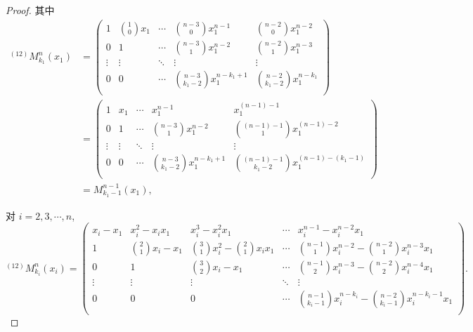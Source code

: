 \documentclass[color=black,device=normal,lang=cn,mode=geye]{elegantnote}
\begin{document}
\begin{landscape}
\begin{proof}
    其中
    \begin{align*}
        ^{(12)}M_{k_1}^n(x_1) & =\begin{pmatrix}
        1 & \binom{1}{0}x_1 & \cdots & \binom{n-3}{0}x_1^{n-1} & \binom{n-2}{0}x_1^{n-2} \\[10pt]
        0 & 1 & \cdots & \binom{n-3}{1}x_1^{n-2} & \binom{n-2}{1}x_1^{n-3} \\
        \vdots & \vdots & \ddots& \vdots  & \vdots \\[4pt]
        0 & 0 & \cdots & \binom{n-3}{k_1-2}x_1^{n-k_1+1} & \binom{n-2}{k_1-2}x_1^{n-k_1} \\
    \end{pmatrix} \\
        & =\begin{pmatrix}
        1 & x_1 & \cdots & x_1^{n-1} & x_1^{(n-1)-1} \\[6pt]
        0 & 1 & \cdots & \binom{n-3}{1}x_1^{n-2} & \binom{(n-1)-1}{1}x_1^{(n-1)-2} \\
        \vdots & \vdots & \ddots& \vdots  & \vdots \\[4pt]
        0 & 0 & \cdots & \binom{n-3}{k_1-2}x_1^{n-k_1+1} & \binom{(n-1)-1}{k_1-2}x_1^{(n-1)-(k_1-1)} \\
    \end{pmatrix} \\
        & =M_{k_1-1}^{n-1}(x_1),
    \end{align*}

    对 $i=2,3,\cdots,n$,
    \[^{(12)}M_{k_i}^n(x_i)=\begin{pmatrix}
        x_i-x_1 & x_i^2-x_ix_1 & x_i^3-x_i^2x_1 & \cdots & x_i^{n-1}-x_i^{n-2}x_1 \\[4pt]
        1 & \binom{2}{1}x_i-x_1 & \binom{3}{1}x_i^2-\binom{2}{1}x_ix_1 & \cdots & \binom{n-1}{1}x_i^{n-2}-\binom{n-2}{1}x_i^{n-3}x_1 \\[10pt]
        0 & 1 & \binom{3}{2}x_i-x_1 & \cdots & \binom{n-1}{2}x_i^{n-3}-\binom{n-2}{2}x_i^{n-4}x_1 \\
        \vdots & \vdots & \vdots & \ddots & \vdots \\[4pt]
        0 & 0 & 0 & \cdots & \binom{n-1}{k_i-1}x_i^{n-k_i}-\binom{n-2}{k_i-1}x_i^{n-k_i-1}x_1 \\
    \end{pmatrix}.\]
    

\end{proof}
\end{landscape}
\end{document}
